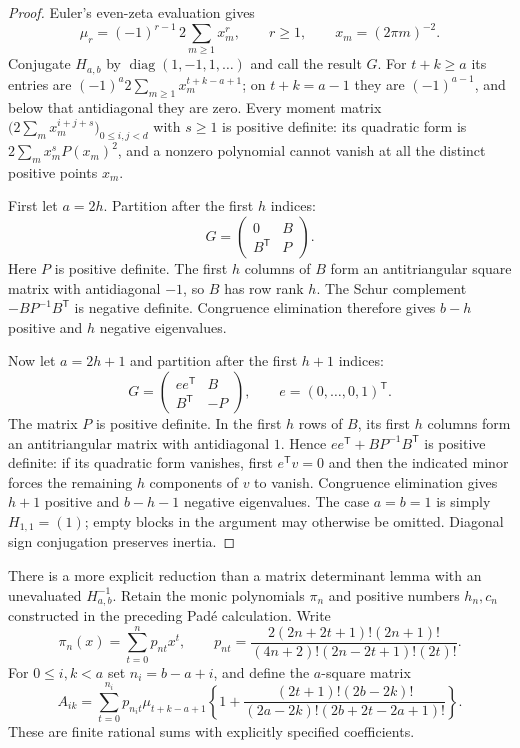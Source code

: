 \documentclass[11pt,a4paper]{article}
\numberwithin{equation}{section}
\theoremstyle{plain}
\theoremstyle{definition}
\theoremstyle{remark}
\begin{document}
\begin{proof}
Euler's even-zeta evaluation gives
\[
 \mu_r=(-1)^{r-1}\,2\sum_{m\geq1}x_m^r,
 \qquad r\geq1,\qquad x_m=(2\pi m)^{-2}.
\]
Conjugate $H_{a,b}$ by $\operatorname{diag}(1,-1,1,\ldots)$ and
call the result $G$.  For $t+k\geq a$ its entries are
$(-1)^a2\sum_{m\geq1}x_m^{t+k-a+1}$; on $t+k=a-1$ they are
$(-1)^{a-1}$, and below that antidiagonal they are zero.
Every moment matrix
$\bigl(2\sum_m x_m^{i+j+s}\bigr)_{0\leq i,j<d}$ with $s\geq1$
is positive definite: its quadratic form is
$2\sum_m x_m^s P(x_m)^2$, and a nonzero polynomial cannot vanish
at all the distinct positive points $x_m$.

First let $a=2h$.  Partition after the first $h$ indices:
\[
 G=\begin{pmatrix}0&B\\B^{\mathsf T}&P\end{pmatrix}.
\]
Here $P$ is positive definite.  The first $h$ columns of $B$ form
an antitriangular square matrix with antidiagonal $-1$, so $B$ has
row rank $h$.  The Schur complement
$-BP^{-1}B^{\mathsf T}$ is negative definite.  Congruence elimination
therefore gives $b-h$ positive and $h$ negative eigenvalues.

Now let $a=2h+1$ and partition after the first $h+1$ indices:
\[
 G=\begin{pmatrix}ee^{\mathsf T}&B\\
 B^{\mathsf T}&-P\end{pmatrix},
 \qquad e=(0,\ldots,0,1)^{\mathsf T}.
\]
The matrix $P$ is positive definite.  In the first $h$ rows of $B$,
its first $h$ columns form an antitriangular matrix with
antidiagonal $1$.  Hence
$ee^{\mathsf T}+BP^{-1}B^{\mathsf T}$ is positive definite:
if its quadratic form vanishes, first $e^{\mathsf T}v=0$ and then
the indicated minor forces the remaining $h$ components of $v$ to
vanish.  Congruence elimination gives $h+1$ positive and
$b-h-1$ negative eigenvalues.  The case $a=b=1$ is simply
$H_{1,1}=(1)$; empty blocks in the argument may otherwise be
omitted.  Diagonal sign conjugation preserves inertia.
\end{proof}

There is a more explicit reduction than a matrix determinant lemma
with an unevaluated $H_{a,b}^{-1}$.  Retain the monic polynomials
$\pi_n$ and positive numbers $h_n,c_n$ constructed in the preceding
Pad\'e calculation.  Write
\[
 \pi_n(x)=\sum_{t=0}^n p_{nt}x^t,
 \qquad
 p_{nt}=\frac{2(2n+2t+1)!(2n+1)!}
 {(4n+2)!(2n-2t+1)!(2t)!}.
\]
For $0\leq i,k<a$ set $n_i=b-a+i$, and define the $a$-square matrix
\begin{equation}\label{eq:general-small-A}
 A_{ik}=\sum_{t=0}^{n_i}p_{n_i t}\mu_{t+k-a+1}
 \left\{1+
 \frac{(2t+1)!(2b-2k)!}
 {(2a-2k)!(2b+2t-2a+1)!}\right\}.
\end{equation}
These are finite rational sums with explicitly specified coefficients.
\end{document}
